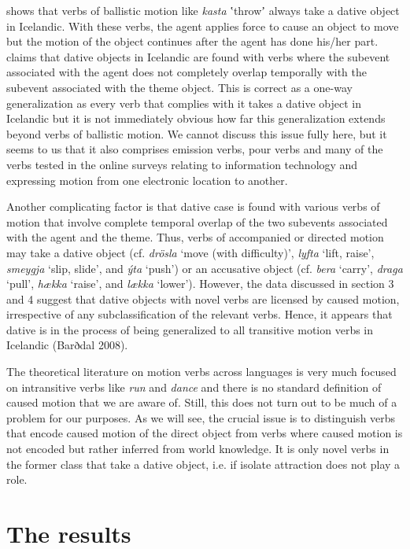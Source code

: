 \citet{Svenonius2002} shows that verbs of ballistic motion like \textit{kasta} ʽthrowʼ always take a dative object in Icelandic. With these verbs, the agent applies force to cause an object to move but the motion of the object continues after the agent has done his/her part. \citet{Svenonius2002} claims that dative objects in Icelandic are found with verbs where the subevent associated with the agent does not completely overlap temporally with the subevent associated with the theme object. This is correct as a one-way generalization as every verb that complies with it takes a dative object in Icelandic but it is not immediately obvious how far this generalization extends beyond verbs of ballistic motion. We cannot discuss this issue fully here, but it seems to us that it also comprises emission verbs, pour verbs and many of the verbs tested in the online surveys relating to information technology and expressing motion from one electronic location to another. 

Another complicating factor is that dative case is found with various verbs of motion that involve complete temporal overlap of the two subevents associated with the agent and the theme. Thus, verbs of accompanied or directed motion may take a dative object (cf. \textit{drösla} ‘move (with difficulty)’, \textit{lyfta} ‘lift, raise’, \textit{smeygja} ‘slip, slide’, and \textit{ýta} ‘push’) or an accusative object (cf. \textit{bera} ‘carry’, \textit{draga} ‘pull’, \textit{hækka} ‘raise’, and \textit{lækka} ‘lower’). However, the data discussed in section 3 and 4 suggest that dative objects with novel verbs are licensed by caused motion, irrespective of any subclassification of the relevant verbs. Hence, it appears that dative is in the process of being generalized to all transitive motion verbs in Icelandic (Barðdal 2008).

The theoretical literature on motion verbs across languages is very much focused on intransitive verbs like \textit{run} and \textit{dance} and there is no standard definition of caused motion that we are aware of. Still, this does not turn out to be much of a problem for our purposes. As we will see, the crucial issue is to distinguish verbs that encode caused motion of the direct object from verbs where caused motion is not encoded but rather inferred from world knowledge. It is only novel verbs in the former class that take a dative object, i.e. if isolate attraction does not play a role.

\section{The results} %

